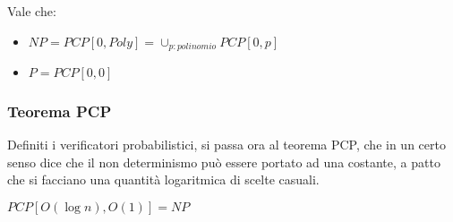 \begin{remark}
    Vale che:
    \begin{itemize}
        \item $NP = PCP[0,\mathit{Poly}] = \cup_{p : \mathit{polinomio}}PCP[0, p]$ 
        \item $P = PCP[0,0]$
    \end{itemize}
\end{remark}

\subsubsection{Teorema PCP}
Definiti i verificatori probabilistici, si passa ora al teorema PCP, 
che in un certo senso dice che il non determinismo può essere portato ad una costante, 
a patto che si facciano una quantità logaritmica di scelte casuali.

\begin{theorem}
    $PCP[O(\log n), O(1)] = NP$
\end{theorem}




